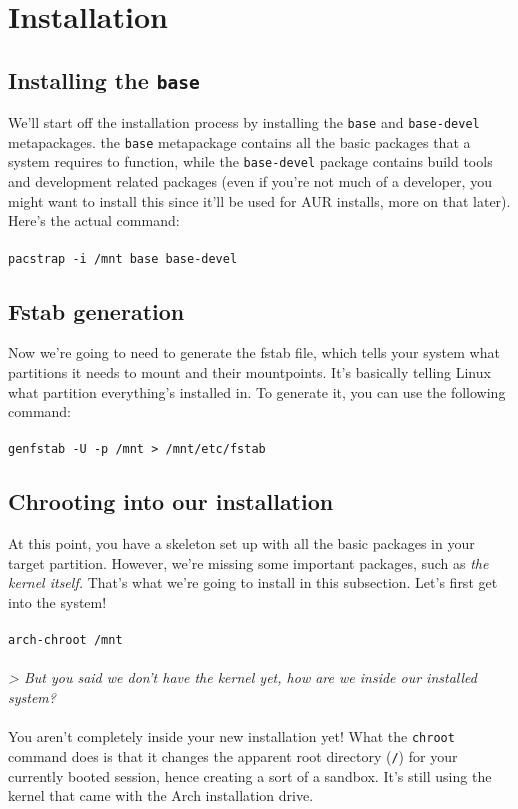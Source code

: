 \documentclass{article}
\begin{document}
\section{Installation}
\subsection{Installing the \texttt{base}}
We'll start off the installation process by installing the \texttt{base} and \texttt{base-devel} metapackages. the \texttt{base} metapackage contains all the basic packages that a system requires to function, while the \texttt{base-devel} package contains build tools and development related packages (even if you're not much of a developer, you might want to install this since it'll be used for AUR installs, more on that later). Here's the actual command:
\\\\
\texttt{pacstrap -i /mnt base base-devel}

\subsection{Fstab generation}
Now we're going to need to generate the fstab file, which tells your system what partitions it needs to mount and their mountpoints. It's basically telling Linux what partition everything's installed in. To generate it, you can use the following command:
\\\\
\texttt{genfstab -U -p /mnt > /mnt/etc/fstab}

\subsection{Chrooting into our installation}
At this point, you have a skeleton set up with all the basic packages in your target partition. However, we're missing some important packages, such as \textit{the kernel itself.} That's what we're going to install in this subsection. Let's first get into the system! 
\\\\
\texttt{arch-chroot /mnt}
\\\\
\textit{> But you said we don't have the kernel yet, how are we inside our installed system?}
\\\\
You aren't completely inside your new installation yet! What the \texttt{chroot} command does is that it changes the apparent root directory (\texttt{/}) for your currently booted session, hence creating a sort of a sandbox. It's still using the kernel that came with the Arch installation drive. 
\\\\
\end{document}
